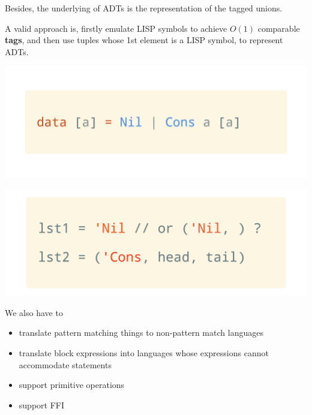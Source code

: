 \documentclass[a1,portrait]{a1poster}
\begin{document}
\begin{multicols}{2}
Besides, the underlying of ADTs is the representation of the tagged unions.

A valid approach is, firstly emulate LISP symbols to achieve $O(1)$ comparable \textbf{tags},
and then use tuples whose 1st element is a LISP symbol, to represent ADTs.
\begin{multicols}{2}

\begin{minipage}[b]{1\linewidth}
\begin{center}\vspace{0.1cm}
    \includegraphics[width=0.9\linewidth]{figs/tagged-union.png}
\end{center}\vspace{0.1cm}
\end{minipage}

\begin{minipage}[b]{1\linewidth}
\begin{center}\vspace{0.1cm}
    \includegraphics[width=0.9\linewidth]{figs/tagged-union-impl.png}
\end{center}\vspace{0.1cm}
\end{minipage}

\end{multicols}

We also have to

\begin{itemize}
    \setlength\itemsep{-0.1em}
    \item translate pattern matching things to non-pattern match languages
    \item translate block expressions \cite{gcc-stmt-expr} \cite{pep572} into languages whose expressions cannot accommodate statements
    \item support primitive operations
    \item support FFI
\end{itemize}


\end{multicols}
\end{document}
